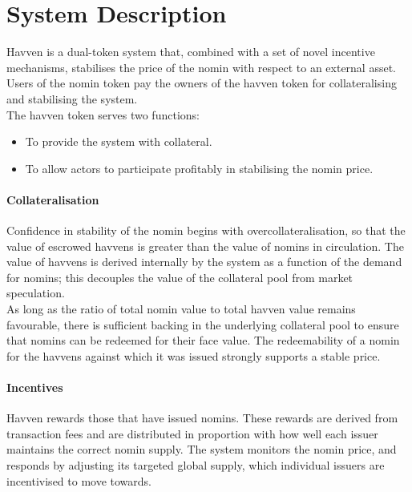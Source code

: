 \section{System Description} Havven is a dual-token system that, combined with a set of novel incentive mechanisms, stabilises the price of the nomin with respect to an external asset. Users of the nomin token pay the owners of the havven token for collateralising and stabilising the system. \\

\noindent The havven token serves two functions:

\begin{itemize}
\item{To provide the system with collateral.}
\item{To allow actors to participate profitably in stabilising the nomin price.}
\end{itemize}

\paragraph{Collateralisation}

\noindent Confidence in stability of the nomin begins with overcollateralisation, so that the value of escrowed havvens is greater than the value of nomins in circulation. The value of havvens is derived internally by the system as a function of the demand for nomins; this decouples the value of the collateral pool from market speculation. \\

\noindent As long as the ratio of total nomin value to total havven value remains favourable, there is sufficient backing in the underlying collateral pool to ensure that nomins can be redeemed for their face value. The redeemability of a nomin for the havvens against which it was issued strongly supports a stable price.  

\paragraph{Incentives}

\noindent Havven rewards those that have issued nomins. These rewards are derived from transaction fees and are distributed in proportion with how well each issuer maintains the correct nomin supply. The system monitors the nomin price, and responds by adjusting its targeted global supply, which individual issuers are incentivised to move towards. \\

